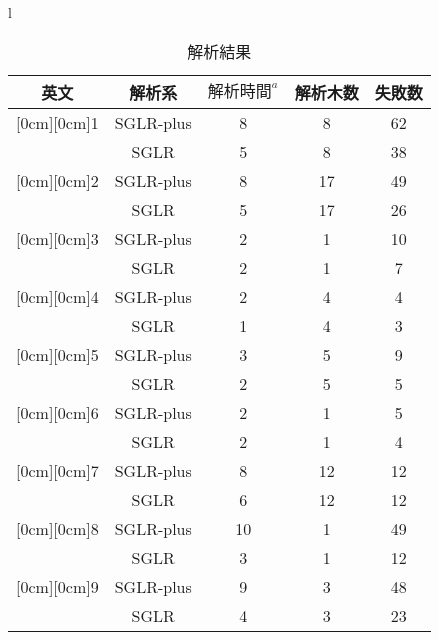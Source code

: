 \begin{table}[htbp]
  \begin{center}
    \caption{解析結果}
    \label{tab:2}
    \begin{tabular}[htbp]{l}
      \begin{tabular}[htbp]{|c||c|c|c|c|} \hline
        英文 & 解析系 & $解析時間^{a}$ & 解析木数 & 失敗数 \\ \hline\hline
        \raisebox{-1.5ex}[0cm][0cm]{1}  & SGLR-plus & 8  & 8  & 62 \\ \cline{2-5}
                                        & SGLR      & 5  & 8  & 38 \\ \hline\hline
        \raisebox{-1.5ex}[0cm][0cm]{2}  & SGLR-plus & 8  & 17 & 49 \\ \cline{2-5}
                                        & SGLR      & 5  & 17 & 26 \\ \hline\hline
        \raisebox{-1.5ex}[0cm][0cm]{3}  & SGLR-plus & 2  & 1  & 10 \\ \cline{2-5}
                                        & SGLR      & 2  & 1  & 7  \\ \hline\hline
        \raisebox{-1.5ex}[0cm][0cm]{4}  & SGLR-plus & 2  & 4  & 4  \\ \cline{2-5}
                                        & SGLR      & 1  & 4  & 3  \\ \hline\hline
        \raisebox{-1.5ex}[0cm][0cm]{5}  & SGLR-plus & 3  & 5  & 9  \\ \cline{2-5}
                                        & SGLR      & 2  & 5  & 5  \\ \hline\hline
        \raisebox{-1.5ex}[0cm][0cm]{6}  & SGLR-plus & 2  & 1  & 5  \\ \cline{2-5}
                                        & SGLR      & 2  & 1  & 4  \\ \hline\hline
        \raisebox{-1.5ex}[0cm][0cm]{7}  & SGLR-plus & 8  & 12 & 12 \\ \cline{2-5}
                                        & SGLR      & 6  & 12 & 12 \\ \hline\hline
        \raisebox{-1.5ex}[0cm][0cm]{8}  & SGLR-plus & 10 & 1  & 49 \\ \cline{2-5}
                                        & SGLR      & 3  & 1  & 12 \\ \hline\hline
        \raisebox{-1.5ex}[0cm][0cm]{9}  & SGLR-plus & 9  & 3  & 48 \\ \cline{2-5}
                                        & SGLR      & 4  & 3  & 23 \\ \hline\hline

\end{tabular}
\end{tabular}
\end{center}
\end{table}
